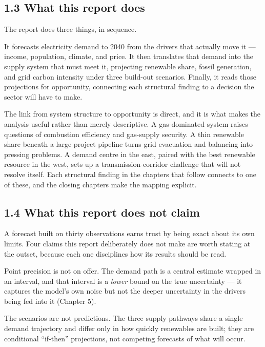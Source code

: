 \documentclass[10pt,twocolumn]{article}
\begin{document}
\subsection*{1.3 What this report does}

The report does three things, in sequence.

It forecasts electricity demand to 2040 from the drivers that actually move it --- income, population, climate, and price. It then translates that demand into the supply system that must meet it, projecting renewable share, fossil generation, and grid carbon intensity under three build-out scenarios. Finally, it reads those projections for opportunity, connecting each structural finding to a decision the sector will have to make.

The link from system structure to opportunity is direct, and it is what makes the analysis useful rather than merely descriptive. A gas-dominated system raises questions of combustion efficiency and gas-supply security. A thin renewable share beneath a large project pipeline turns grid evacuation and balancing into pressing problems. A demand centre in the east, paired with the best renewable resource in the west, sets up a transmission-corridor challenge that will not resolve itself. Each structural finding in the chapters that follow connects to one of these, and the closing chapters make the mapping explicit.

\subsection*{1.4 What this report does not claim}

A forecast built on thirty observations earns trust by being exact about its own limits. Four claims this report deliberately does not make are worth stating at the outset, because each one disciplines how its results should be read.

Point precision is not on offer. The demand path is a central estimate wrapped in an interval, and that interval is a \textit{lower} bound on the true uncertainty --- it captures the model's own noise but not the deeper uncertainty in the drivers being fed into it (Chapter 5).

The scenarios are not predictions. The three supply pathways share a single demand trajectory and differ only in how quickly renewables are built; they are conditional ``if-then'' projections, not competing forecasts of what will occur.
\end{document}
